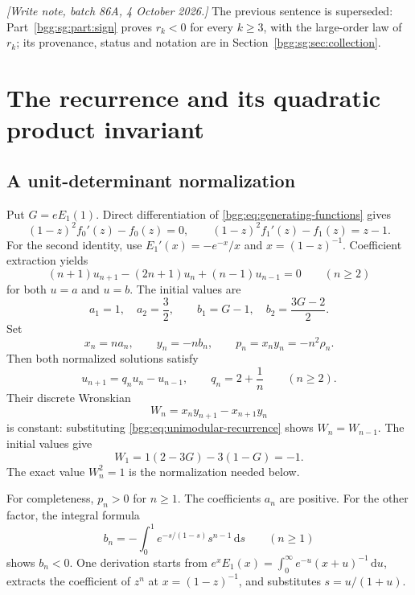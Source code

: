 \documentclass[11pt,a4paper]{article}
\numberwithin{equation}{section}
\theoremstyle{definition}
\theoremstyle{remark}
\theoremstyle{definition}
\newcommand{\dif}{\,\mathrm d}
\begin{document}
\emph{[Write note, batch 86A, 4 October 2026.]} The previous sentence is
superseded: Part~\ref{bgg:sg:part:sign} proves $r_k<0$ for every $k\ge3$,
with the large-order law of $r_k$; its provenance, status and notation
are in Section~\ref{bgg:sg:sec:collection}.

\section{The recurrence and its quadratic product invariant}
\label{bgg:sec:invariant}

\subsection{A unit-determinant normalization}

Put $G=eE_1(1)$. Direct differentiation of \eqref{bgg:eq:generating-functions}
gives
\begin{equation}\label{bgg:eq:odes}
 (1-z)^2f_0'(z)-f_0(z)=0,\qquad
 (1-z)^2f_1'(z)-f_1(z)=z-1.
\end{equation}
For the second identity, use $E_1'(x)=-e^{-x}/x$ and
$x=(1-z)^{-1}$. Coefficient extraction yields
\begin{equation}\label{bgg:eq:original-recurrence}
 (n+1)u_{n+1}-(2n+1)u_n+(n-1)u_{n-1}=0\qquad(n\ge2)
\end{equation}
for both $u=a$ and $u=b$. The initial values are
\[
 a_1=1,\quad a_2=\frac32,\qquad
 b_1=G-1,\quad b_2=\frac{3G-2}{2}.
\]
Set
\begin{equation}\label{bgg:eq:normalized-solutions}
 x_n=na_n,\qquad y_n=-nb_n,\qquad p_n=x_ny_n=-n^2\rho_n.
\end{equation}
Then both normalized solutions satisfy
\begin{equation}\label{bgg:eq:unimodular-recurrence}
 u_{n+1}=q_nu_n-u_{n-1},\qquad q_n=2+\frac1n\qquad(n\ge2).
\end{equation}
Their discrete Wronskian
\[
 W_n=x_ny_{n+1}-x_{n+1}y_n
\]
is constant: substituting \eqref{bgg:eq:unimodular-recurrence} shows
$W_n=W_{n-1}$. The initial values give
\[
 W_1=1(2-3G)-3(1-G)=-1.
\]
The exact value $W_n^2=1$ is the normalization needed below.

For completeness, $p_n>0$ for $n\ge1$. The coefficients $a_n$ are positive.
For the other factor, the integral formula
\begin{equation}\label{bgg:eq:b-integral}
 b_n=-\int_0^1 e^{-s/(1-s)}s^{n-1}\dif s\qquad(n\ge1)
\end{equation}
shows $b_n<0$. One derivation starts from
$e^xE_1(x)=\int_0^\infty e^{-u}(x+u)^{-1}\dif u$, extracts the coefficient
of $z^n$ at $x=(1-z)^{-1}$, and substitutes $s=u/(1+u)$.
\end{document}

